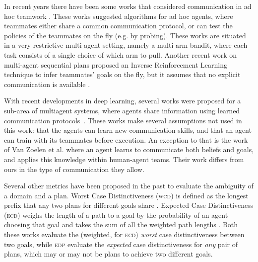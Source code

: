 \documentclass[letterpaper]{article}
\begin{document}
In recent years there have been some works that considered communication in ad hoc teamwork \cite{barrett2014communicating,chakraborty2017coordinated}. 
These works suggested algorithms for ad hoc agents, where teammates either share a common communication protocol, or can test the policies of the teammates on the fly (e.g. by probing). 
These works are situated in a very restrictive multi-agent setting, namely a multi-arm bandit, where each task consists of a single choice of which arm to pull. Another recent work on multi-agent sequential plans proposed an Inverse Reinforcement Learning technique to infer teammates' goals on the fly, but it assumes that no explicit communication is available \cite{wang2020too}.

With recent developments in deep learning, several works were proposed for a sub-area of multiagent systems, where agents share information using learned communication protocols~\cite{hernandez2019survey,mordatch2018emergence,foerster2016learning}. These works make several assumptions not used in this work: that the agents can learn new communication skills, and that an agent can train with its teammates before execution. An exception to that is the work of Van Zoelen et al.  where an agent learns to communicate both beliefs and goals, and applies this knowledge within human-agent teams. Their work differs from ours in the type of communication they allow.

Several other metrics have been proposed in the past to evaluate the ambiguity of a domain and a plan. Worst Case Distinctiveness (\textsc{wcd}) is defined as the longest prefix that any two plans for different goals share \cite{keren2014goal}. Expected Case Distinctiveness (\textsc{ecd}) weighs the length of a path to a goal by the probability of an agent choosing that goal and takes the sum of all the weighted path lengths \cite{wayllace2017new}. Both these works evaluate the (weighted, for \textsc{ecd}) \emph{worst} case distinctiveness between two goals, while \textsc{edp} evaluate the \emph{expected} case distinctiveness for \emph{any} pair of plans, which may or may not be plans to achieve two different goals. 
\end{document}
